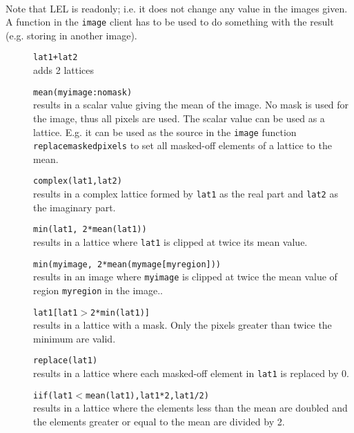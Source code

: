 \\Note that LEL is readonly; i.e. it does not change any value in
the images given. A function in the \texttt{image} client has to
be used to do something with the result (e.g. storing in another image).
\begin{description}
  \item[] \texttt{lat1+lat2}
    \\adds 2 lattices
  \item[] \texttt{mean(myimage:nomask)}
    \\results in a scalar value giving the mean of the image.
    No mask is used for the image, thus all pixels are used.
    The scalar value can be used as a lattice. E.g. it can be used as
    the source in the \texttt{image} function
    \texttt{replacemaskedpixels} to set all masked-off elements of a
    lattice to the mean.
  \item[] \texttt{complex(lat1,lat2)}
    \\results in a complex lattice formed by \texttt{lat1} as the
    real part and \texttt{lat2} as the imaginary part.
  \item[] \texttt{min(lat1, 2*mean(lat1))}
    \\results in a lattice where \texttt{lat1} is clipped at twice
    its mean value.
  \item[] \texttt{min(myimage, 2*mean(mymage[myregion]))}
    \\results in an image where \texttt{myimage} is clipped at twice
    the mean value of region \texttt{myregion} in the image..
  \item[] \texttt{lat1[lat1$>$2*min(lat1)]}
    \\results in a lattice with a mask. Only the pixels
    greater than twice the minimum are valid.
  \item[] \texttt{replace(lat1)}
    \\results in a lattice where each masked-off element in
    \texttt{lat1} is replaced by 0.
  \item[] \texttt{iif(lat1$<$mean(lat1),lat1*2,lat1/2)}
    \\results in a lattice where the elements less than the mean
    are doubled and the elements greater or equal to the mean are
    divided by 2.
\end{description}


